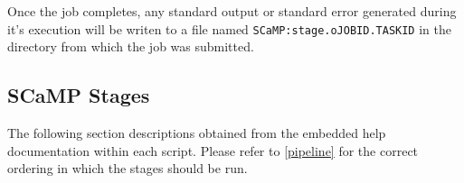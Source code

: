 \documentclass[a4paper,10pt]{article}
\begin{document}
Once the job completes, any standard output or standard error generated during
it's execution will be writen to a file named {\tt SCaMP:stage.oJOBID.TASKID}
in the directory from which the job was submitted.

\subsection{SCaMP Stages}

The following section descriptions obtained from the embedded help
documentation within each script. Please refer to \ref{pipeline} for the
correct ordering in which the stages should be run.



\end{document}
